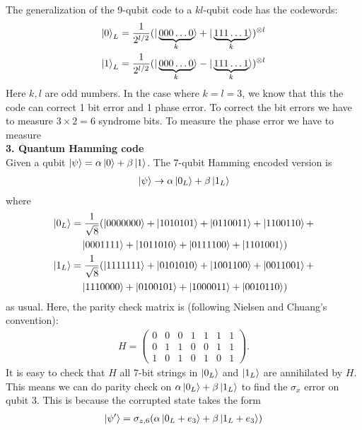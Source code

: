 \documentclass{article}
\theoremstyle{definition}
\newcommand{\al}{\alpha}
\newcommand{\be}{\beta}
\newcommand{\f}[2]{\frac{#1}{#2}}
\begin{document}
\noindent The generalization of the 9-qubit code to a $kl$-qubit code has the codewords:
\begin{align*}
	\ket{0}_L = \f{1}{2^{l/2}} ( |\underbrace{000\dots 0}_{k}\rangle + |\underbrace{111\dots 1}_{k}\rangle )^{\otimes l} \\
	\ket{1}_L = \f{1}{2^{l/2}} ( |\underbrace{000\dots 0}_{k}\rangle - |\underbrace{111\dots 1}_{k}\rangle )^{\otimes l}
\end{align*}
Here $k,l$ are odd numbers. In the case where $k=l=3$, we know that this the code can correct 1 bit error and 1 phase error. To correct the bit errors we have to measure $3\times 2 = 6$ syndrome bits. To measure the phase error we have to measure\\




\noindent \textbf{3. Quantum Hamming code}\\

\noindent Given a qubit $\ket{\psi} = \al\ket{0} + \be\ket{1}$. The 7-qubit Hamming encoded version is 
\begin{align*}
	\ket{\psi} \to \al\ket{0_L} + \be\ket{1_L}
\end{align*}
where 
\begin{align*}
	\ket{0_L} &= \f{1}{\sqrt{8}}(\ket{0000000} + \ket{1010101} + \ket{0110011} + \ket{1100110} + \\
	&\quad \ket{0001111}+ \ket{1011010} + \ket{0111100} + \ket{1101001}) \\
	\ket{1_L} &= \f{1}{\sqrt{8}}( \ket{1111111} + \ket{0101010} + \ket{1001100} + \ket{0011001} + \\
	&\quad \ket{1110000} + \ket{0100101} + \ket{1000011} + \ket{0010110})
\end{align*}
as usual. Here, the parity check matrix is (following Nielsen and Chuang's convention):
\begin{align*}
	H = \begin{pmatrix}
		0 & 0 & 0 & 1 & 1 & 1 & 1\\
		0 & 1 & 1 & 0 & 0 & 1 & 1\\
		1 & 0 & 1 & 0 & 1 & 0 & 1 
	\end{pmatrix}.
\end{align*}
It is easy to check that $H$ all 7-bit strings in $\ket{0_L}$ and $\ket{1_L}$ are annihilated by $H$. This means we can do parity check on $\al\ket{0_L} + \be\ket{1_L}$ to find the $\sigma_x$ error on qubit 3. This is because the corrupted state takes the form
\begin{align*}
	\ket{\psi'} = \sigma_{z,6} (\al \ket{0_L + e_3} + \be\ket{1_L+e_3})
\end{align*}
\end{document}
